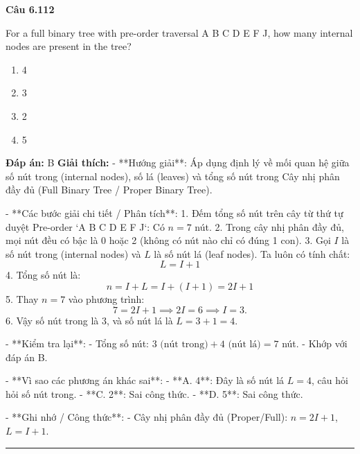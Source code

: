 \documentclass[11pt,a4paper]{article}
\newenvironment{question}[1]{%
  \par\vspace{1em}\noindent\textbf{\large Câu #1}\par\vspace{0.4em}
}{%
  \par\vspace{1em}\hrule\vspace{0.6em}
}
\newenvironment{choices}{%
  \begin{enumerate}[label=\textbf{\Alph*.},leftmargin=2.2em,itemsep=2pt,topsep=3pt]
}{%
  \end{enumerate}
}
\newcommand{\choice}{\item}
\begin{document}
\begin{question}{6.112}
For a full binary tree with pre-order traversal A B C D E F J, how many internal nodes are present in the tree?
\begin{choices}
\choice 4
\choice 3
\choice 2
\choice 5
\end{choices}
\textbf{Đáp án:} B
\textbf{Giải thích:} - **Hướng giải**:
  Áp dụng định lý về mối quan hệ giữa số nút trong (internal nodes), số lá (leaves) và tổng số nút trong Cây nhị phân đầy đủ (Full Binary Tree / Proper Binary Tree).

- **Các bước giải chi tiết / Phân tích**:
  1. Đếm tổng số nút trên cây từ thứ tự duyệt Pre-order `A B C D E F J`: Có \(n = 7\) nút.
  2. Trong cây nhị phân đầy đủ, mọi nút đều có bậc là 0 hoặc 2 (không có nút nào chỉ có đúng 1 con).
  3. Gọi \(I\) là số nút trong (internal nodes) và \(L\) là số nút lá (leaf nodes). Ta luôn có tính chất:
     \[ L = I + 1 \]
  4. Tổng số nút là:
     \[ n = I + L = I + (I + 1) = 2I + 1 \]
  5. Thay \(n = 7\) vào phương trình:
     \[ 7 = 2I + 1 \implies 2I = 6 \implies I = 3. \]
  6. Vậy số nút trong là 3, và số nút lá là \(L = 3 + 1 = 4\).

- **Kiểm tra lại**:
  - Tổng số nút: \(3 \text{ (nút trong)} + 4 \text{ (nút lá)} = 7\) nút.
  - Khớp với đáp án B.

- **Vì sao các phương án khác sai**:
  - **A. 4**: Đây là số nút lá \(L = 4\), câu hỏi hỏi số nút trong.
  - **C. 2**: Sai công thức.
  - **D. 5**: Sai công thức.

- **Ghi nhớ / Công thức**:
  - Cây nhị phân đầy đủ (Proper/Full): \(n = 2I + 1\), \(L = I + 1\).
\end{question}
\end{document}
